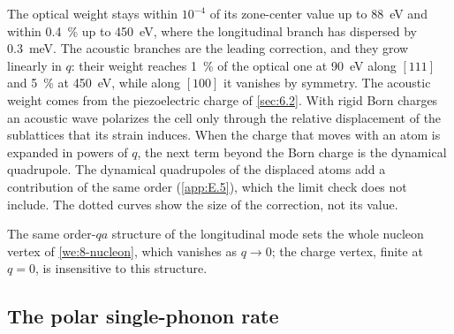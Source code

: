 The optical weight stays within $10^{-4}$ of its zone-center value up to \SI{88}{eV} and within \SI{0.4}{\percent} up to \SI{450}{eV}, where the longitudinal branch has dispersed by \SI{0.3}{meV}. The acoustic branches are the leading correction, and they grow linearly in $q$: their weight reaches \SI{1}{\percent} of the optical one at \SI{90}{eV} along $[111]$ and \SI{5}{\percent} at \SI{450}{eV}, while along $[100]$ it vanishes by symmetry. The acoustic weight comes from the piezoelectric charge of \cref{sec:6.2}. With rigid Born charges an acoustic wave polarizes the cell only through the relative displacement of the sublattices that its strain induces. When the charge that moves with an atom is expanded in powers of $q$, the next term beyond the Born charge is the dynamical quadrupole. The dynamical quadrupoles of the displaced atoms add a contribution of the same order (\cref{app:E.5}), which the limit check does not include. The dotted curves show the size of the correction, not its value.

The same order-$qa$ structure of the longitudinal mode sets the whole nucleon vertex of \cref{we:8-nucleon}, which vanishes as $q \to 0$; the charge vertex, finite at $q = 0$, is insensitive to this structure.

\subsection{The polar single-phonon rate}\label{sec:11.2-rate}

